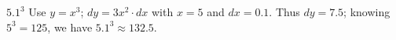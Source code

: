 {$5.1^3$
}
{Use $y = x^3$; $dy = 3x^2\cdot dx$ with $x=5$ and $dx = 0.1$. Thus $dy = 7.5$; knowing $5^3=125$, we have $5.1^3 \approx 132.5$.
}

